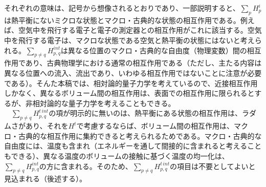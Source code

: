それぞれの意味は、記号から想像されるとおりであり、一部説明すると、$\sum_p H_p^i$は熱平衡にないミクロな状態とマクロ・古典的な状態の相互作用である。例えば、空気中を飛行する電子と電子の測定器との相互作用がこれに該当する。空気中を飛行する電子は、マクロな状態である空気と熱平衡の状態にはないと考えられる。$\sum_{p \neq q}H^{int}_{p,q}$は異なる位置のマクロ・古典的な自由度（物理変数）間の相互作用であり、古典物理学における通常の相互作用である（ただし、主たる内容は異なる位置への流入、流出であり、いわゆる相互作用ではないことに注意が必要である）。そんた本稿では、相対論的量子力学を考えているので、近接相互作用しかなく、異なるボリューム間の相互作用は、表面での相互作用に限られるとするが、非相対論的な量子力学を考えることもできる。\\
　$\sum_{p \neq q} H_{p,q}^{t\,int}$の項が明示的に無いのは、熱平衡にある状態の相互作用は、ラダムさがあり、それを$H^t$で考慮するならば、ボリューム間の相互作用は、マクロ・古典的な相互作用に集約できると考えられるためである。マクロ・古典的な自由度には、温度も含まれ（エネルギーを通して間接的に含まれると考えることもできる）、異なる温度のボリュームの接触に基づく温度の均一化は、$\sum_{p \neq q} H^{int}_{p,q}$の方に含まれる。そのため、$\sum_{p \neq q} H_{p,q}^{t\,int}$の項目は不要としてよいと見込まれる（後述する）。
